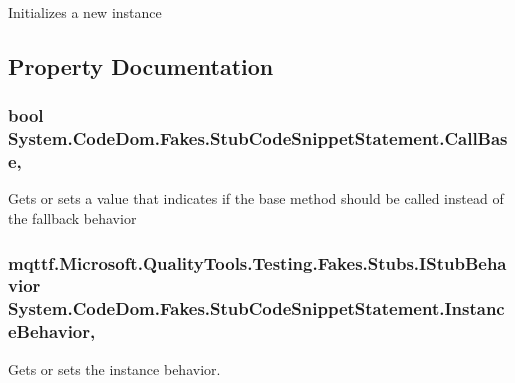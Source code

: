 Initializes a new instance



\subsection{Property Documentation}
\hypertarget{class_system_1_1_code_dom_1_1_fakes_1_1_stub_code_snippet_statement_a65323896fee82dcb6f291a79d29a6192}{
\subsubsection[{Call\-Base}]{\setlength{\rightskip}{0pt plus 5cm}bool System.\-Code\-Dom.\-Fakes.\-Stub\-Code\-Snippet\-Statement.\-Call\-Base\hspace{0.3cm}{\ttfamily [get]}, {\ttfamily [set]}}}\label{class_system_1_1_code_dom_1_1_fakes_1_1_stub_code_snippet_statement_a65323896fee82dcb6f291a79d29a6192}


Gets or sets a value that indicates if the base method should be called instead of the fallback behavior

\hypertarget{class_system_1_1_code_dom_1_1_fakes_1_1_stub_code_snippet_statement_a2c2254e725175f281eb1570022828fd3}{
\subsubsection[{Instance\-Behavior}]{\setlength{\rightskip}{0pt plus 5cm}mqttf.\-Microsoft.\-Quality\-Tools.\-Testing.\-Fakes.\-Stubs.\-I\-Stub\-Behavior System.\-Code\-Dom.\-Fakes.\-Stub\-Code\-Snippet\-Statement.\-Instance\-Behavior\hspace{0.3cm}{\ttfamily [get]}, {\ttfamily [set]}}}\label{class_system_1_1_code_dom_1_1_fakes_1_1_stub_code_snippet_statement_a2c2254e725175f281eb1570022828fd3}


Gets or sets the instance behavior.

